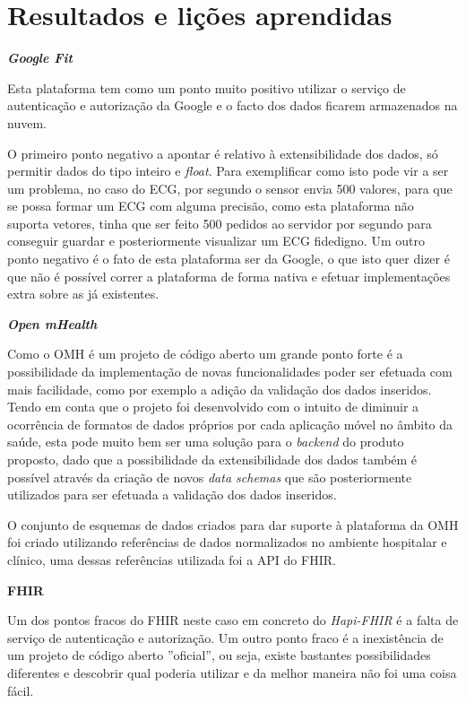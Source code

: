 \section{Resultados e lições aprendidas}

\textbf{\textit{Google Fit}}
\par
Esta plataforma tem como um ponto muito positivo utilizar o serviço de autenticação e autorização da Google e o facto dos dados ficarem armazenados na nuvem.\par 
O primeiro ponto negativo a apontar é relativo à extensibilidade dos dados, só permitir dados do tipo inteiro e \textit{float}. Para exemplificar como isto pode vir a ser um problema, no caso do \gls{ECG}, por segundo o sensor envia 500 valores, para que se possa formar um \gls{ECG} com alguma precisão, como esta plataforma não suporta vetores, tinha que ser feito 500 pedidos ao servidor por segundo para conseguir guardar e posteriormente visualizar um \gls{ECG} fidedigno. Um outro ponto negativo é o fato de esta plataforma ser da Google, o que isto quer dizer é que não é possível correr a plataforma de forma nativa e efetuar implementações extra sobre as já existentes.
\par
\textbf{\textit{Open mHealth}}
\par
Como o \gls{OMH} é um projeto de código aberto um grande ponto forte é a possibilidade da implementação de novas funcionalidades poder ser efetuada com mais facilidade, como por exemplo a adição da validação dos dados inseridos. Tendo em conta que o projeto foi desenvolvido com o intuito de diminuir a ocorrência de formatos de dados próprios por cada aplicação móvel no âmbito da saúde, esta pode muito bem ser uma solução para o \textit{backend} do produto proposto, dado que a possibilidade da extensibilidade dos dados também é possível através da criação de novos \textit{data schemas} que são posteriormente utilizados para ser efetuada a validação dos dados inseridos.
\par
O conjunto de esquemas de dados criados para dar suporte à plataforma da \gls{OMH} foi criado utilizando referências de dados normalizados no ambiente hospitalar e clínico, uma dessas referências utilizada foi a \gls{API} do \gls{FHIR}.
\par
\textbf{FHIR}
\par
Um dos pontos fracos do FHIR neste caso em concreto do \textit{Hapi-FHIR} é a falta de serviço de autenticação e autorização. Um outro ponto fraco é a inexistência de um projeto de código aberto ''oficial'', ou seja, existe bastantes possibilidades diferentes e descobrir qual poderia utilizar e da melhor maneira não foi uma coisa fácil.
